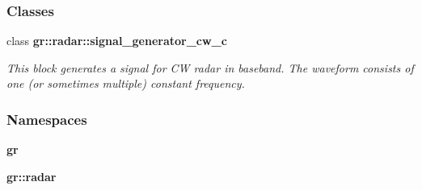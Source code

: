 \subsubsection*{Classes}
\begin{DoxyCompactItemize}
\item 
class {\bf gr\+::radar\+::signal\+\_\+generator\+\_\+cw\+\_\+c}
\begin{DoxyCompactList}\small\item\em This block generates a signal for CW radar in baseband. The waveform consists of one (or sometimes multiple) constant frequency. \end{DoxyCompactList}\end{DoxyCompactItemize}
\subsubsection*{Namespaces}
\begin{DoxyCompactItemize}
\item 
 {\bf gr}
\item 
 {\bf gr\+::radar}
\end{DoxyCompactItemize}
